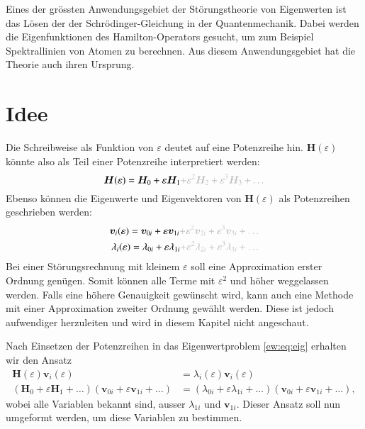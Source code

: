 Eines der grössten Anwendungsgebiet der Störungstheorie von Eigenwerten ist das Lösen der der Schrödinger-Gleichung in der Quantenmechanik.
%
%
Dabei werden die Eigenfunktionen des Hamilton-Operators gesucht, um zum Beispiel Spektrallinien von Atomen zu berechnen.
%
%
%
%
Aus diesem Anwendungsgebiet hat die Theorie auch ihren Ursprung.

\section{Idee}
Die Schreibweise als Funktion von $\varepsilon$ deutet auf eine Potenzreihe hin.
$\bm H(\varepsilon)$ könnte also als Teil einer Potenzreihe interpretiert werden:
\begin{equation*}
    \bm H(\varepsilon) = \bm H_0 + \varepsilon \bm H_1 \GR{ + \varepsilon^2 \bm H_2  + \varepsilon^3 \bm H_3 + \dots}
\end{equation*}
Ebenso können die Eigenwerte und Eigenvektoren von $\bm H(\varepsilon)$ als Potenzreihen geschrieben werden:
\begin{align}
    \bm v_i(\varepsilon) = \bm v_{0i} + \varepsilon \bm v_{1i} \GR{ + \varepsilon^2 \bm v_{2i}  + \varepsilon^3 \bm v_{3i} + \dots} \label{ew:eq:eigvec} \\
    \lambda_i(\varepsilon) = \lambda_{0i} + \varepsilon \lambda_{1i} \GR{ + \varepsilon^2 \lambda_{2i}  + \varepsilon^3 \lambda_{3i} + \dots}  \label{ew:eq:eigval}
\end{align}
Bei einer Störungsrechnung mit kleinem $\varepsilon$ soll eine Approximation erster Ordnung genügen.
Somit können alle Terme mit $\varepsilon^2$ und höher weggelassen werden.
Falls eine höhere Genauigkeit gewünscht wird, kann auch eine Methode mit einer Approximation zweiter Ordnung gewählt werden.
Diese ist jedoch aufwendiger herzuleiten und wird in diesem Kapitel nicht angeschaut.

Nach Einsetzen der Potenzreihen in das Eigenwertproblem \eqref{ew:eq:eig} erhalten wir den Ansatz
\begin{align}
    \bm H(\varepsilon) \bm v_i(\varepsilon)
    &=
    \lambda_i(\varepsilon) \bm v_i(\varepsilon) \\
    (\bm H_0 + \varepsilon \bm H_1 + \dots)
    (\bm v_{0i} + \varepsilon \bm v_{1i} + \dots)
    &=
    (\lambda_{0i} + \varepsilon \lambda_{1i} + \dots)
    (\bm v_{0i} + \varepsilon \bm v_{1i} + \dots),
\end{align}
wobei alle Variablen bekannt sind, ausser $\lambda_{1i}$ und $\bm v_{1i}$.
Dieser Ansatz soll nun umgeformt werden, um diese Variablen zu bestimmen.

